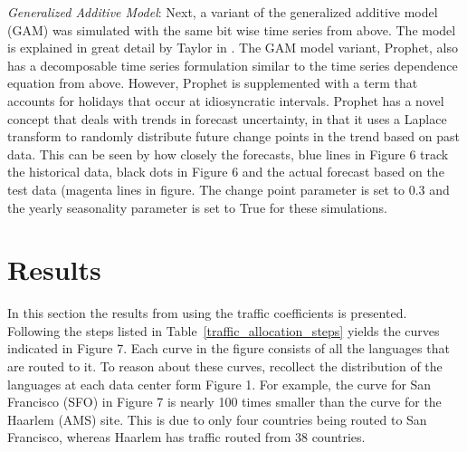     
    \emph{Generalized Additive Model}: Next, a variant of the generalized additive model (GAM) was simulated with the same bit wise time series from above. The model is explained in great detail by Taylor in \cite{fbprophet}. The GAM model variant, Prophet, also has a decomposable time series formulation similar to the time series dependence equation from above. However, Prophet is supplemented with a term that accounts for holidays that occur at idiosyncratic  intervals. Prophet has a novel concept that deals with trends in forecast uncertainty, in that it uses a Laplace transform to randomly distribute future change points in the trend based on past data. This can be seen by how closely the forecasts, blue lines in Figure 6 track the historical data, black dots in Figure 6 and the actual forecast based on the test data (magenta lines in figure. The change point parameter is set to 0.3 and the yearly seasonality parameter is set to True for these simulations. 
    
    
\section {Results}

    In this section the results from using the traffic coefficients is presented. Following the steps listed in Table~\ref{traffic_allocation_steps} yields the curves indicated in Figure 7. Each curve in the figure consists of all the languages that are routed to it. To reason about these curves, recollect the distribution of the languages at each data center form Figure 1. For example, the curve for San Francisco (SFO) in Figure 7 is nearly 100 times smaller than the curve for the Haarlem (AMS) site. This is due to only four countries being routed to San Francisco, whereas Haarlem has traffic routed from 38 countries. 